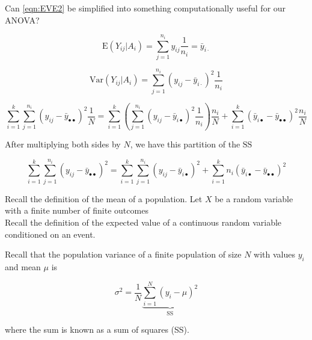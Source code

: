 \documentclass[
]{book}
\newcommand{\E}{\mathrm{E}}
\newcommand{\Var}{\mathrm{Var}}
\begin{document}
Can \ref{eqn:EVE2} be simplified into something computationally useful for our ANOVA?

\begin{equation}
\label{eqn:EVE2.1}
\E(Y_{ij}|A_i) = \sum_{j = 1}^{n_i} y_{ij} \frac{1}{n_i} = \bar{y}_{i \cdot}
\end{equation}

\begin{equation}
\label{eqn:EVE2.2}
\Var(Y_{ij}|A_i) = \sum_{j = 1}^{n_i} \left(y_{ij} - \bar{y}_{i \cdot} \right)^2 \frac{1}{n_i}
\end{equation}

\begin{equation}
\label{eqn:EVE2.3}
\sum_{i=1}^{k} \sum_{j = 1}^{n_i} \left( y_{ij} - \bar{y}_{\bullet\bullet} \right)^2 \frac{1}{N} = \sum_{i=1}^{k} \left( \sum_{j = 1}^{n_i} \left(y_{ij} - \bar{y}_{i \bullet} \right)^2 \frac{1}{n_i} \right) \frac{n_i}{N} +
\sum_{i=1}^{k} \left( \bar{y}_{i \bullet} - \bar{y}_{\bullet\bullet} \right)^2 \frac{n_i}{N}
\end{equation}

After multiplying both sides by \(N\), we have this partition of the \(\text{SS}\)

\begin{equation}
\label{eqn:EVE2.4}
\sum_{i=1}^{k} \sum_{j = 1}^{n_i} \left( y_{ij} - \bar{y}_{\bullet\bullet} \right)^2 = \sum_{i=1}^{k} \sum_{j = 1}^{n_i} \left(y_{ij} - \bar{y}_{i \bullet} \right)^2 +
\sum_{i=1}^{k} n_i\left( \bar{y}_{i \bullet} - \bar{y}_{\bullet\bullet} \right)^2 
\end{equation}

Recall \autocite{expected_val} the definition of the mean of a population. Let \(X\) be a random variable with a finite number of finite outcomes\\

Recall \autocite{conditional_expected_val1}\autocite{conditional_expected_val2} the definition of the expected value of a continuous random variable conditioned on an event.

Recall \autocite{variance} that the population variance of a finite population of size \(N\) with values \(y_i\) and mean \(\mu\) is

\begin{equation}
\label{eqn:pop_var}
\sigma^2 = \frac{1}{N} \underbrace{\sum_{i = 1}^{N} \left(y_i-\mu\right)^2}_{\text{SS}}
\end{equation}

where the sum is known as a sum of squares (SS).
\end{document}
